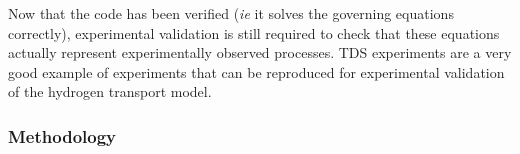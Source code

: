 Now that the code has been verified (\textit{ie} it solves the governing equations correctly), experimental validation is still required to check that these equations actually represent experimentally observed processes.
TDS experiments are a very good example of experiments that can be reproduced for experimental validation of the hydrogen transport model.

\subsubsection{Methodology} \label{methodology}


